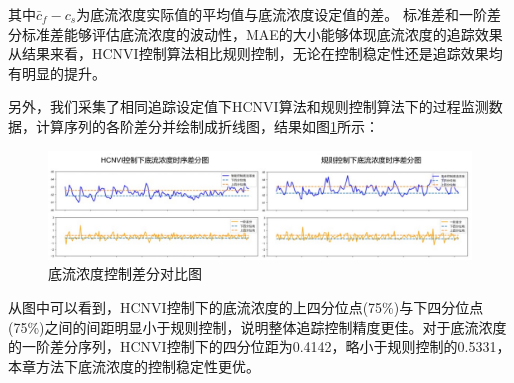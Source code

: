 其中$\bar{c}_{f}-{c}_{s}$为底流浓度实际值的平均值与底流浓度设定值的差。
标准差和一阶差分标准差能够评估底流浓度的波动性，MAE的大小能够体现底流浓度的追踪效果
从结果来看，HCNVI控制算法相比规则控制，无论在控制稳定性还是追踪效果均有明显的提升。

另外，我们采集了相同追踪设定值下HCNVI算法和规则控制算法下的过程监测数据，计算序列的各阶差分并绘制成折线图，结果如图\ref{fig:difference}所示：
\begin{figure}[ht]
  \centering
  \includegraphics[width=\linewidth]{figures/chapter6/difference.pdf}
  \caption{底流浓度控制差分对比图}
  \label{fig:difference}
\end{figure}
从图中可以看到，HCNVI控制下的底流浓度的上四分位点(75\%)与下四分位点(75\%)之间的间距明显小于规则控制，说明整体追踪控制精度更佳。对于底流浓度的一阶差分序列，HCNVI控制下的四分位距为0.4142，略小于规则控制的0.5331，本章方法下底流浓度的控制稳定性更优。

